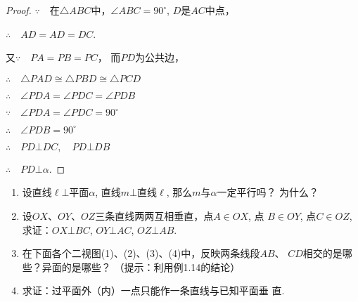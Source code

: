 \begin{figure}[htp]
  \centering
{}
  \caption{}
\end{figure}

\begin{proof}
$\because\quad $在$\triangle ABC$中，$\angle ABC=90^{\circ}$, $D$是$AC$中点，

$\therefore\quad AD=AD=DC$.

又$\because\quad PA=PB=PC$，
而$PD$为公共边，

$\therefore\quad \triangle PAD\cong \triangle PBD\cong \triangle PCD$

$\therefore\quad \angle PDA=\angle PDC=\angle PDB$

$\because\quad \angle PDA=\angle PDC=90^{\circ}$

$\therefore\quad \angle PDB=90^{\circ}$

$\therefore\quad PD\bot DC,\quad PD\bot DB$

$\therefore\quad PD\bot \alpha$.
\end{proof}

\begin{ex}
\begin{enumerate}
  \item 设直线$\ell\bot$平面$\alpha$, 直线$m\bot $直线$\ell$, 那么$m$与$\alpha$一定平行吗？
  为什么？
  \item 设$OX$、$OY$、$OZ$三条直线两两互相垂直，点$A\in OX$, 点
  $B\in OY$, 点$C\in OZ$, 求证：$OX\bot BC$, $OY\bot AC$, $OZ\bot 
  AB$.
  \item 在下面各个二视图(1)、(2)、(3)、(4)中，反映两条线段$AB$、
  $CD$相交的是哪些？异面的是哪些？
  （提示：利用例1.14的结论）
  \item 求证：过平面外（内）一点只能作一条直线与已知平面垂
  直. 
\end{enumerate}
\end{ex}

